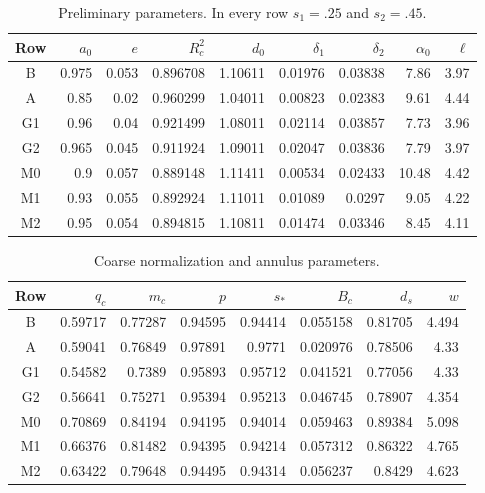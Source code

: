 \documentclass[11pt,reqno]{amsart}
\numberwithin{equation}{section}
\theoremstyle{definition}
\theoremstyle{remark}
\begin{document}
\begin{table}[ht]
\centering\small
\caption{Preliminary parameters.  In every row $s_1=.25$ and $s_2=.45$.}
\label{bc:preliminary-table}
\begin{tabular}{@{}crrrrrrrr@{}}\toprule
Row&$a_0$&$e$&$R_c^2$&$d_0$&$\delta_1$&$\delta_2$&$\alpha_0$&$\ell$\\\midrule
B & 0.975 & 0.053 & 0.896708 & 1.10611 & 0.01976 & 0.03838 & 7.86 & 3.97\\
A & 0.85 & 0.02 & 0.960299 & 1.04011 & 0.00823 & 0.02383 & 9.61 & 4.44\\
G1 & 0.96 & 0.04 & 0.921499 & 1.08011 & 0.02114 & 0.03857 & 7.73 & 3.96\\
G2 & 0.965 & 0.045 & 0.911924 & 1.09011 & 0.02047 & 0.03836 & 7.79 & 3.97\\
M0 & 0.9 & 0.057 & 0.889148 & 1.11411 & 0.00534 & 0.02433 & 10.48 & 4.42\\
M1 & 0.93 & 0.055 & 0.892924 & 1.11011 & 0.01089 & 0.0297 & 9.05 & 4.22\\
M2 & 0.95 & 0.054 & 0.894815 & 1.10811 & 0.01474 & 0.03346 & 8.45 & 4.11\\
\bottomrule\end{tabular}
\end{table}
\begin{table}[ht]
\centering\small
\caption{Coarse normalization and annulus parameters.}
\label{bc:coarse-table}
\begin{tabular}{@{}crrrrrrr@{}}\toprule
Row&$q_c$&$m_c$&$p$&$s_*$&$B_c$&$d_s$&$w$\\\midrule
B & 0.59717 & 0.77287 & 0.94595 & 0.94414 & 0.055158 & 0.81705 & 4.494\\
A & 0.59041 & 0.76849 & 0.97891 & 0.9771 & 0.020976 & 0.78506 & 4.33\\
G1 & 0.54582 & 0.7389 & 0.95893 & 0.95712 & 0.041521 & 0.77056 & 4.33\\
G2 & 0.56641 & 0.75271 & 0.95394 & 0.95213 & 0.046745 & 0.78907 & 4.354\\
M0 & 0.70869 & 0.84194 & 0.94195 & 0.94014 & 0.059463 & 0.89384 & 5.098\\
M1 & 0.66376 & 0.81482 & 0.94395 & 0.94214 & 0.057312 & 0.86322 & 4.765\\
M2 & 0.63422 & 0.79648 & 0.94495 & 0.94314 & 0.056237 & 0.8429 & 4.623\\
\bottomrule\end{tabular}
\end{table}
\end{document}
